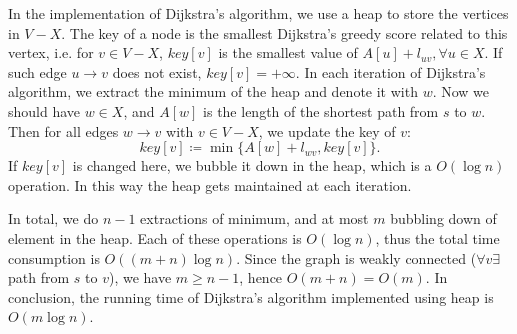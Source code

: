 In the implementation of Dijkstra's algorithm, we use a heap to store the vertices in $V-X$. The key of a node is the smallest Dijkstra's greedy score related to this vertex, i.e. for $v\in V-X$, $key[v]$ is the smallest value of $A[u]+l_{uv},\forall u\in X$. If such edge $u\rightarrow v$ does not exist, $key[v]=+\infty.$ In each iteration of Dijkstra's algorithm, we extract the minimum of the heap and denote it with $w$. Now we should have $w\in X$, and $A[w]$ is the length of the shortest path from $s$ to $w$. Then for all edges $w\rightarrow v$ with $v\in V-X$, we update the key of $v$:
$$key[v]\coloneqq\min\{A[w]+l_{wv},key[v]\}.$$
If $key[v]$ is changed here, we bubble it down in the heap, which is a $O(\log n)$ operation. In this way the heap gets maintained at each iteration.

In total, we do $n-1$ extractions of minimum, and at most $m$ bubbling down of element in the heap. Each of these operations is $O(\log n)$, thus the total time consumption is $O((m+n)\log n)$. Since the graph is weakly connected ($\forall v\exists$ path from $s$ to $v$), we have $m\geq n-1$, hence $O(m+n)=O(m)$. In conclusion, the running time of Dijkstra's algorithm implemented using heap is $O(m\log n)$.
\ifx\PREAMBLE\undefined

\fi